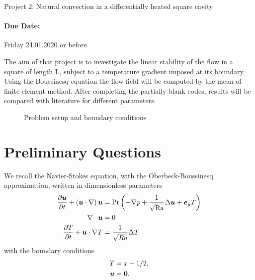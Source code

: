 \documentclass[12pt,a4paper]{scrartcl}
\renewcommand{\vec}[1]{{\mbox{\boldmath $ #1 $}}}
\def\Pran{\mbox{Pr}}  %
\def\Ra{\mbox{Ra}}    %
\begin{document}
\begin{center}
{\Large{Project 2: Natural convection in a differentially heated square cavity}}
\end{center}
\paragraph{Due Date:} Friday 24.01.2020 or before

The aim of that project is to investigate the linear stability of the flow in a square of length L, subject to a
temperature gradient imposed at its boundary. Using the Boussinesq equation the flow
field will be computed by the mean of finite element method. After completing the partially blank codes, results will be compared with literature for different parameters.

\begin{figure}
\centering
{}
\caption{Problem setup and boundary conditions}
\end{figure}


\section{Preliminary Questions}

We recall the Navier-Stokes equation, with the Oberbeck-Boussinesq approximation, written in dimensionless parameters
\begin{align}\label{eq:NS}
\frac{\partial  \vec u}{\partial t} + \left( \vec u\cdot \nabla \right)\vec u &= \Pran \left(-\nabla p + \frac{1}{\sqrt{\Ra}}\Delta \vec u + \vec e_y  T\right) \\
\nabla \cdot \vec u &= 0 \nonumber\\
\frac{\partial T}{\partial t}  + \vec u \cdot \nabla T &= \frac{1}{\sqrt{Ra}} \Delta T \nonumber
\end{align}
with the boundary conditions
\begin{align}
T &= x-1/2, \\
\vec u &= \vec 0\text{.}
\end{align}
\end{document}
